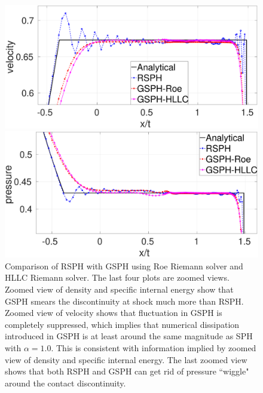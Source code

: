 \begin{figure}
\begin{minipage}{.495 \textwidth}
    \end{minipage}%
    \\
    \begin{minipage}{.495 \textwidth}
        \centering
        \includegraphics[width=0.99 \textwidth]{Chapter-4/Figures/Sod/RCM-Sod-GSPH-compare-v-zoom}
    \end{minipage}%
    \begin{minipage}{.495\textwidth}
        \centering
        \includegraphics[width=0.99 \textwidth]{Chapter-4/Figures/Sod/RCM-Sod-GSPH-compare-p-zoom}
    \end{minipage}%
    \caption{Comparison of RSPH with GSPH using Roe Riemann solver and HLLC Riemann solver. The last four plots are zoomed views. Zoomed view of density and specific internal energy show that GSPH smears the discontinuity at shock much more than RSPH. Zoomed view of velocity shows that fluctuation in GSPH is completely suppressed, which implies that numerical dissipation introduced in GSPH is at least around the same magnitude as SPH with $\alpha=1.0$. This is consistent with information implied by zoomed view of density and specific internal energy. The last zoomed view shows that both RSPH and GSPH can get rid of pressure ``wiggle" around the contact discontinuity.}
    \label{fig:RCM-Sod-GSPH}
\end{figure}

